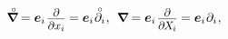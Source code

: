 \nopagebreak\vspace{-0.25em}\begin{equation*}
\boldnablacircled \hspace{-0.1ex}
= \bm{e}_i \hspace{.2ex} \scalebox{0.9}{$ \displaystyle \frac{\raisemath{-0.2em}{\partial}}{\partial x_i} $} \hspace{-0.1ex}
= \bm{e}_i \hspace{.15ex} \mathcircabove{\partial}_i
\hspace{.1ex} , \:\:
%
\boldnabla \hspace{-0.1ex}
= \bm{e}_i \hspace{.2ex} \scalebox{0.9}{$ \displaystyle \frac{\raisemath{-0.2em}{\partial}}{\partial \hspace{-0.2ex} X_{\hspace{-0.1ex}i}} $} \hspace{-0.1ex}
= \bm{e}_i \hspace{.15ex} \partial_i
\hspace{.1ex} ,
\end{equation*}

